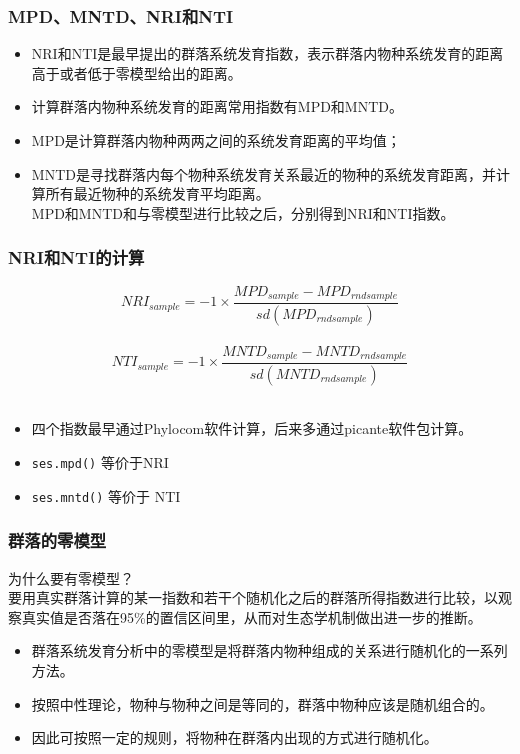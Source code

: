 \documentclass[UTF8]{ctexbeamer}
\begin{document}
\begin{frame}
\frametitle{MPD、MNTD、NRI和NTI}
\begin{itemize}
\item NRI和NTI是最早提出的群落系统发育指数，表示群落内物种系统发育的距离高于或者低于零模型给出的距离。\\
\item 计算群落内物种系统发育的距离常用指数有MPD和MNTD。\\
\item MPD是计算群落内物种两两之间的系统发育距离的平均值；\\
\item MNTD是寻找群落内每个物种系统发育关系最近的物种的系统发育距离，并计算所有最近物种的系统发育平均距离。 \\
MPD和MNTD和与零模型进行比较之后，分别得到NRI和NTI指数。\\
\end{itemize}
\end{frame}

\begin{frame}
\frametitle{NRI和NTI的计算}
\[NRI_{sample} = -1 \times \frac{ MPD_{sample} - MPD_{rndsample} }{sd(MPD_{rndsample})}\]\\
\[NTI_{sample} = -1 \times \frac{ MNTD_{sample} - MNTD_{rndsample} }{sd(MNTD_{rndsample})}\] \\


\begin{itemize}
\item 四个指数最早通过Phylocom软件计算，后来多通过picante软件包计算。
\item {\tt ses.mpd()} 等价于NRI
\item {\tt ses.mntd()} 等价于 NTI

\end{itemize}
\end{frame}

\begin{frame}
\frametitle{群落的零模型}
为什么要有零模型？\\
要用真实群落计算的某一指数和若干个随机化之后的群落所得指数进行比较，以观察真实值是否落在95\%的置信区间里，从而对生态学机制做出进一步的推断。
\begin{itemize}
\item 群落系统发育分析中的零模型是将群落内物种组成的关系进行随机化的一系列方法。
\item 按照中性理论，物种与物种之间是等同的，群落中物种应该是随机组合的。
\item 因此可按照一定的规则，将物种在群落内出现的方式进行随机化。
\end{itemize}

\end{frame}
\end{document}
